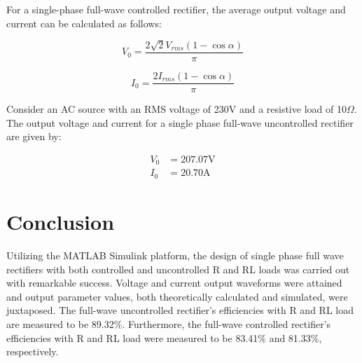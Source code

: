 For a single-phase full-wave controlled rectifier, the average output voltage and current can be calculated as follows:

\begin{equation}
    V_0 = \frac{2\sqrt{2}V_{rms}(1-\cos\alpha)}{\pi}
\end{equation}

\begin{equation}
    I_0 = \frac{2I_{rms}(1-\cos\alpha)}{\pi}
\end{equation}

Consider an AC source with an RMS voltage of 230V and a resistive load of 10$ \Omega $. The output voltage and current for a single phase full-wave uncontrolled rectifier are given by:

\begin{align}
    V_{0} & = 207.07\mathrm{V} \\
    I_{0} & = 20.70\mathrm{A}
\end{align}




\pagebreak





\section{Conclusion}


\hspace{\parindent}

Utilizing the MATLAB Simulink platform, the design of single phase full wave rectifiers with both controlled and uncontrolled R and RL loads was carried out with remarkable success. Voltage and current output waveforms were attained and output parameter values, both theoretically calculated and simulated, were juxtaposed.
The full-wave uncontrolled rectifier's efficiencies with R and RL load are measured to be 89.32\%. Furthermore, the full-wave controlled rectifier's efficiencies with R and RL load were measured to be 83.41\% and 81.33\%, respectively.

